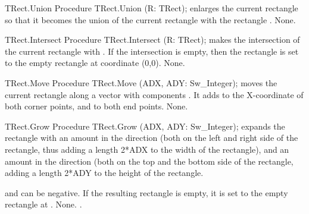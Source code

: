 \html{}

\begin{procedure}{TRect.Union}
\Declaration
Procedure TRect.Union (R: TRect);
\Description
{} enlarges the current rectangle so that it becomes the union
of the current rectangle with the rectangle .
\Errors
None.
\SeeAlso
{}
\end{procedure}

\html{}

\begin{procedure}{TRect.Intersect}
\Declaration
Procedure TRect.Intersect (R: TRect);
\Description
{} makes the intersection of the current rectangle with
. If the intersection is empty, then the rectangle is set to the empty
rectangle at coordinate (0,0).
\Errors
None.
\SeeAlso
{}
\end{procedure}

\html{}

\begin{procedure}{TRect.Move}
\Declaration
Procedure TRect.Move (ADX, ADY: Sw\_Integer);
\Description
{} moves the current rectangle along a vector with components
. It adds  to the X-coordinate of both corner
points, and  to both end points.
\Errors
None.
\SeeAlso
{}
\end{procedure}

\html{}

\begin{procedure}{TRect.Grow}
\Declaration
Procedure TRect.Grow (ADX, ADY: Sw\_Integer);
\Description
{} expands the rectangle with an amount  in the 
direction (both on the left and right side of the rectangle, thus adding a 
length 2*ADX to the width of the rectangle), and an amount  in 
the  direction (both on the top and the bottom side of the rectangle,
adding a length 2*ADY to the height of the rectangle. 

 and  can be negative. If the resulting rectangle is empty, it is set 
to the empty rectangle at .
\Errors
None.
\SeeAlso
{}.
\end{procedure}


